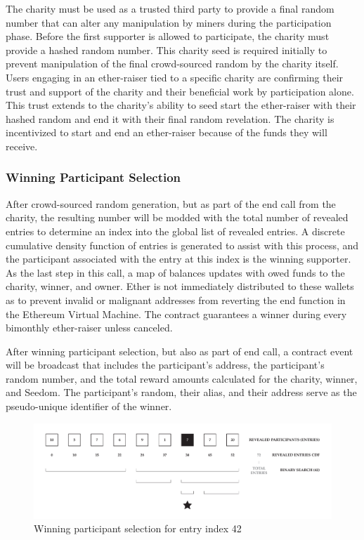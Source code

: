 \documentclass[11pt]{article}
\begin{document}
The charity must be used as a trusted third party to provide a final random number that can alter any manipulation by miners during the participation phase. Before the first supporter is allowed to participate, the charity must provide a hashed random number. This charity seed is required initially to prevent manipulation of the final crowd-sourced random by the charity itself. Users engaging in an ether-raiser tied to a specific charity are confirming their trust and support of the charity and their beneficial work by participation alone. This trust extends to the charity's ability to seed start the ether-raiser with their hashed random and end it with their final random revelation. The charity is incentivized to start and end an ether-raiser because of the funds they will receive.

\subsubsection{Winning Participant Selection}

After crowd-sourced random generation, but as part of the end call from the charity, the resulting number will be modded with the total number of revealed entries to determine an index into the global list of revealed entries. A discrete cumulative density function of entries is generated to assist with this process, and the participant associated with the entry at this index is the winning supporter. As the last step in this call, a map of balances updates with owed funds to the charity, winner, and owner. Ether is not immediately distributed to these wallets as to prevent invalid or malignant addresses from reverting the end function in the Ethereum Virtual Machine. The contract guarantees a winner during every bimonthly ether-raiser unless canceled.

After winning participant selection, but also as part of end call, a contract event will be broadcast that includes the participant's address, the participant's random number, and the total reward amounts calculated for the charity, winner, and Seedom. The participant's random, their alias, and their address serve as the pseudo-unique identifier of the winner.

\begin{figure}[H]
\begin{center}
\includegraphics[width=1.0\textwidth]{./graphics/winningParticipantSelection.pdf}
\caption{Winning participant selection for entry index 42}
\label{figure:winningParticipantSelection}
\end{center}
\end{figure}
\end{document}
